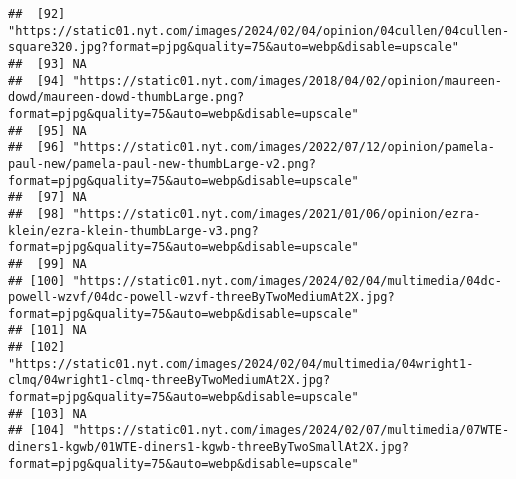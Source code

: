 \documentclass[
]{article}
\begin{document}
\begin{verbatim}
##  [92] "https://static01.nyt.com/images/2024/02/04/opinion/04cullen/04cullen-square320.jpg?format=pjpg&quality=75&auto=webp&disable=upscale"                                                                 
##  [93] NA                                                                                                                                                                                                    
##  [94] "https://static01.nyt.com/images/2018/04/02/opinion/maureen-dowd/maureen-dowd-thumbLarge.png?format=pjpg&quality=75&auto=webp&disable=upscale"                                                        
##  [95] NA                                                                                                                                                                                                    
##  [96] "https://static01.nyt.com/images/2022/07/12/opinion/pamela-paul-new/pamela-paul-new-thumbLarge-v2.png?format=pjpg&quality=75&auto=webp&disable=upscale"                                               
##  [97] NA                                                                                                                                                                                                    
##  [98] "https://static01.nyt.com/images/2021/01/06/opinion/ezra-klein/ezra-klein-thumbLarge-v3.png?format=pjpg&quality=75&auto=webp&disable=upscale"                                                         
##  [99] NA                                                                                                                                                                                                    
## [100] "https://static01.nyt.com/images/2024/02/04/multimedia/04dc-powell-wzvf/04dc-powell-wzvf-threeByTwoMediumAt2X.jpg?format=pjpg&quality=75&auto=webp&disable=upscale"                                   
## [101] NA                                                                                                                                                                                                    
## [102] "https://static01.nyt.com/images/2024/02/04/multimedia/04wright1-clmq/04wright1-clmq-threeByTwoMediumAt2X.jpg?format=pjpg&quality=75&auto=webp&disable=upscale"                                       
## [103] NA                                                                                                                                                                                                    
## [104] "https://static01.nyt.com/images/2024/02/07/multimedia/07WTE-diners1-kgwb/01WTE-diners1-kgwb-threeByTwoSmallAt2X.jpg?format=pjpg&quality=75&auto=webp&disable=upscale"                                

\end{verbatim}
\end{document}
